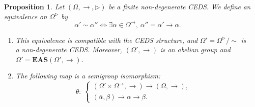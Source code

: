 \documentclass[pdftex]{sigma}
\numberwithin{equation}{section}
\newtheorem{Proposition}[Theorem]{Proposition}
 { \theoremstyle{definition}
\newtheorem{Definition}[Theorem]{Definition}
\newtheorem{Note}[Theorem]{Note}
\newtheorem{Example}[Theorem]{Example}
\newtheorem{Remark}[Theorem]{Remark}
\newtheorem{Notation}[Theorem]{Notation}}
\newcommand{\eas}{\mathbf{EAS}}
\begin{document}
\begin{Proposition}\label{prop3.12}
Let $(\Omega,\rightarrow,\triangleright)$ be a finite non-degenerate CEDS. We define an equivalence on $\Omega^\triangleright$ by
\[\alpha' \sim \alpha'' \Longleftrightarrow \exists \alpha \in \Omega^\rightarrow, \ \alpha''=\alpha'\rightarrow \alpha.\]
\begin{enumerate}\itemsep=0pt
\item[$(1)$] This equivalence is compatible with the CEDS structure, and $\Omega'=\Omega^\triangleright/{\sim}$ is a non-degen\-er\-ate CEDS. Moreover, $(\Omega',\rightarrow)$ is an abelian group and $\Omega'=\eas(\Omega',\rightarrow)$.
\item[$(2)$] The following map is a semigroup isomorphism:
\[\theta\colon \ \begin{cases}
(\Omega' \times \Omega^\rightarrow,\rightarrow) \longrightarrow (\Omega,\rightarrow),\\
(\overline{\alpha},\beta) \longrightarrow \alpha \rightarrow \beta.
\end{cases}\] \end{enumerate} \end{Proposition}
\end{document}
